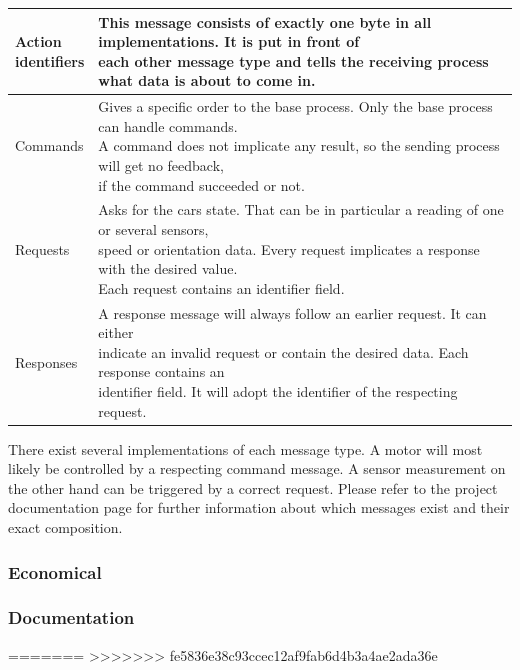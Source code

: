\begingroup
\begin{tabular}[t]{|l|l|}
\hline
\makecell{Action\\identifiers} & \makecell{This message consists of exactly one byte in all implementations. It is put in front of\\each other message type and tells the receiving process what data is about to come in.}\\
\hline
Commands & \makecell{Gives a specific order to the base process. Only the base process can handle commands.\\A command does not implicate any result, so the sending process will get no feedback,\\if the command succeeded or not.}\\
\hline
Requests & \makecell{Asks for the cars state. That can be in particular a reading of one or several sensors,\\speed or orientation data. Every request implicates a response with the desired value.\\Each request contains an identifier field.}\\
\hline
Responses & \makecell{A response message will always follow an earlier request. It can either\\indicate an invalid request or contain the desired data. Each response contains an\\identifier field. It will adopt the identifier of the respecting request.}\\
\hline
\end{tabular}
\label{tbl:message_definition}
\endgroup

There exist several implementations of each message type. A motor will most likely be controlled by a respecting command message. A sensor measurement on the other hand can be triggered by a correct request. Please refer to the project documentation page \cite{docu} for further information about which messages exist and their exact composition.

\subsubsection{Economical}

\subsubsection{Documentation}

=======
>>>>>>> fe5836e38c93ccec12af9fab6d4b3a4ae2ada36e

